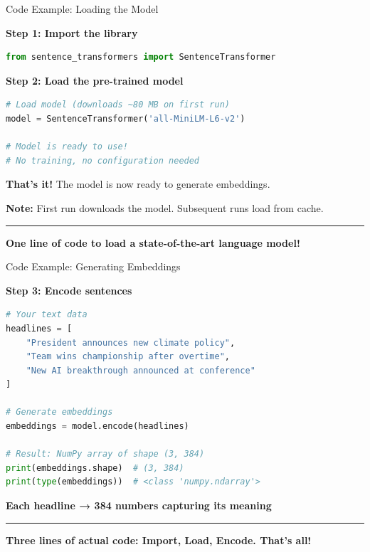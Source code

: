 \documentclass[8pt,aspectratio=169]{beamer}
\newcommand{\bottomnote}[1]{%
\vfill
\vspace{-2mm}
\textcolor{mllavender2}{\rule{\textwidth}{0.4pt}}
\vspace{1mm}
\footnotesize
\textbf{#1}
}
\begin{document}
\begin{frame}[t,fragile]{Code Example: Loading the Model}

\textbf{Step 1: Import the library}

\begin{lstlisting}[language=Python]
from sentence_transformers import SentenceTransformer
\end{lstlisting}

\vspace{0.5cm}

\textbf{Step 2: Load the pre-trained model}

\begin{lstlisting}[language=Python]
# Load model (downloads ~80 MB on first run)
model = SentenceTransformer('all-MiniLM-L6-v2')

# Model is ready to use!
# No training, no configuration needed
\end{lstlisting}

\vspace{0.5cm}

\textbf{That's it!} The model is now ready to generate embeddings.

\vspace{0.3cm}

\textbf{Note:} First run downloads the model. Subsequent runs load from cache.

\bottomnote{One line of code to load a state-of-the-art language model!}
\end{frame}

\begin{frame}[t,fragile]{Code Example: Generating Embeddings}

\textbf{Step 3: Encode sentences}

\begin{lstlisting}[language=Python]
# Your text data
headlines = [
    "President announces new climate policy",
    "Team wins championship after overtime",
    "New AI breakthrough announced at conference"
]

# Generate embeddings
embeddings = model.encode(headlines)

# Result: NumPy array of shape (3, 384)
print(embeddings.shape)  # (3, 384)
print(type(embeddings))  # <class 'numpy.ndarray'>
\end{lstlisting}

\vspace{0.3cm}

\textbf{Each headline → 384 numbers capturing its meaning}

\bottomnote{Three lines of actual code: Import, Load, Encode. That's all!}
\end{frame}
\end{document}
